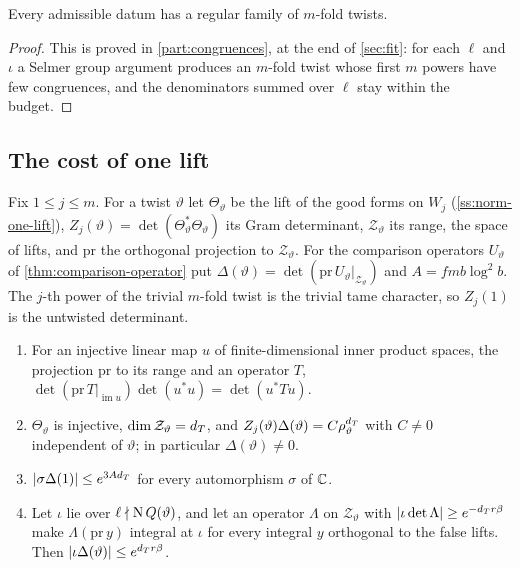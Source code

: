 \begin{theorem}\label{thm:regular-family}
Every admissible datum has a regular family of $m$-fold twists.
\end{theorem}

\begin{proof}
This is proved in \cref{part:congruences}, at the end of \cref{sec:fit}: for each $\ell$ and $\iota$ a Selmer group argument produces an $m$-fold twist whose first $m$ powers have
few congruences, and the denominators summed over $\ell$ stay within the budget.
\end{proof}

\subsection{The cost of one lift}\label{ss:cost-one-lift}
Fix $1\le j\le m$. For a twist $\vartheta$ let $\Theta_\vartheta$ be the lift of the good forms on $W_j$ (\cref{ss:norm-one-lift}), $Z_j(\vartheta)=\det(\Theta_\vartheta^*\Theta_\vartheta)$ its Gram determinant, $\mathcal Z_\vartheta$ its range, the space of lifts, and
$\mathrm{pr}$ the orthogonal projection to $\mathcal Z_\vartheta$. For the comparison operators $U_\vartheta$ of \cref{thm:comparison-operator} put $\Delta(\vartheta)=\det(\mathrm{pr}\,U_\vartheta|_{\mathcal Z_\vartheta})$ and $A=fmb\log^2b$. The $j$-th power of the trivial
$m$-fold twist is the trivial tame character, so $Z_j(1)$ is the untwisted determinant.

\begin{lemma}\label{lem:compression}
\begin{enumerate}[label=\textup{(\alph*)}]
\item For an injective linear map $u$ of finite-dimensional inner product spaces, the projection $\mathrm{pr}$ to its range and an operator $T$, $\det(\mathrm{pr}\,T|_{\operatorname{im}u})\det(u^*u)=\det(u^*Tu)$.
\item $\Theta_\vartheta$ is injective, $\dim\mathcal Z_\vartheta=d_T$, and $Z_j(\vartheta)\Delta(\vartheta)=C\rho_\vartheta^{d_T}$ with $C\ne0$ independent of $\vartheta$; in particular $\Delta(\vartheta)\ne0$.
\item $\lvert \sigma\Delta(1)\rvert\le e^{3Ad_T}$ for every automorphism $\sigma$ of $\mathbb{C}$.
\item Let $\iota$ lie over $\ell\nmid\operatorname{N} Q(\vartheta)$, and let an operator $\Lambda$ on $\mathcal Z_\vartheta$ with $\lvert \iota\det\Lambda\rvert\ge e^{-d_T r\beta}$ make $\Lambda(\mathrm{pr}\,y)$ integral at $\iota$ for every integral $y$ orthogonal to the false lifts.
Then $\lvert \iota\Delta(\vartheta)\rvert\le e^{d_T r\beta}$.
\end{enumerate}
\end{lemma}

